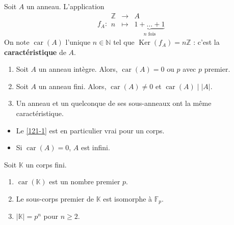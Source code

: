 
  \begin{definition}
    Soit $A$ un anneau. L'application
    \[
      f_A :
      \begin{array}{ccc}
        \mathbb{Z} &\rightarrow& A \\
        n &\mapsto& \underbrace{1 + \dots + 1}_{n \text{ fois}}
      \end{array}
    \]
    On note $\operatorname{car}(A)$ l'unique $n \in \mathbb{N}$ tel que $\operatorname{Ker}(f_A) = n\mathbb{Z}$ : c'est la \textbf{caractéristique} de $A$.
  \end{definition}

  \begin{proposition}
    \begin{enumerate}[label={\bfseries(\roman*)}]
      \item \label{121-1} Soit $A$ un anneau intègre. Alors, $\operatorname{car}(A) = 0 \text{ ou } p$ avec $p$ premier.
      \item Soit $A$ un anneau fini. Alors, $\operatorname{car}(A) \neq 0$ et $\operatorname{car}(A) \mid |A|$.
      \item Un anneau et un quelconque de ses sous-anneaux ont la même caractéristique.
    \end{enumerate}
  \end{proposition}

  \begin{remark}
    \begin{itemize}
      \item Le \cref{121-1} est en particulier vrai pour un corps.
      \item Si $\operatorname{car}(A) = 0$, $A$ est infini.
    \end{itemize}
  \end{remark}


  \begin{proposition}
    Soit $\mathbb{K}$ un corps fini.
    \begin{enumerate}[label={\bfseries(\roman*)}]
      \item $\operatorname{car}(\mathbb{K})$ est un nombre premier $p$.
      \item Le sous-corps premier de $\mathbb{K}$ est isomorphe à $\mathbb{F}_p$.
      \item $\vert \mathbb{K} \vert = p^n$ pour $n \geq 2$.
    \end{enumerate}
  \end{proposition}

